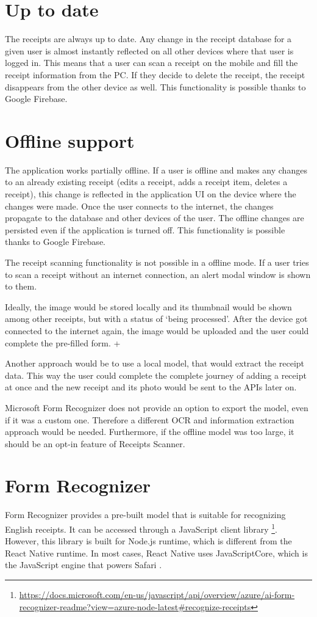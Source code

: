 \documentclass[
  digital, %
  table,   %
  oneside, %
  lof,     %
  lot,     %
]{fithesis3}
\begin{document}
\chapter{Up to date}
The receipts are always up to date. Any change in the receipt database for a given user is almost instantly reflected on all other devices where that user is logged in. This means that a user can scan a receipt on the mobile and fill the receipt information from the PC. If they decide to delete the receipt, the receipt disappears from the other device as well.
This functionality is possible thanks to Google Firebase.

\chapter{Offline support}
The application works partially offline. If a user is offline and makes any changes to an already existing receipt (edits a receipt, adds a receipt item, deletes a receipt), this change is reflected in the application UI on the device where the changes were made. Once the user connects to the internet, the changes propagate to the database and other devices of the user. The offline changes are persisted even if the application is turned off. This functionality is possible thanks to Google Firebase.

The receipt scanning functionality is not possible in a offline mode. If a user tries to scan a receipt without an internet connection, an alert modal window is shown to them.

Ideally, the image would be stored locally and its thumbnail would be shown among other receipts, but with a status of ‘being processed’. After the device got connected to the internet again, the image would be uploaded and the user could complete the pre-filled form. +

Another approach would be to use a local model, that would extract the receipt data. This way the user could complete the complete journey of adding a receipt at once and the new receipt and its photo would be sent to the APIs later on. 

Microsoft Form Recognizer does not provide an option to export the model, even if it was a custom one. Therefore a different OCR and information extraction approach would be needed. Furthermore, if the offline model was too large, it should be an opt-in feature of Receipts Scanner.


\chapter{Form Recognizer}
Form Recognizer provides a pre-built model that is suitable for recognizing English receipts. It can be accessed through a JavaScript client library \footnote{\url{https://docs.microsoft.com/en-us/javascript/api/overview/azure/ai-form-recognizer-readme?view=azure-node-latest\#recognize-receipts}}. However, this library is built for Node.js runtime, which is different from the React Native runtime. In most cases, React Native uses JavaScriptCore, which is the JavaScript engine that powers Safari \cite{JavaScriptRNEnvironment}.
\end{document}
